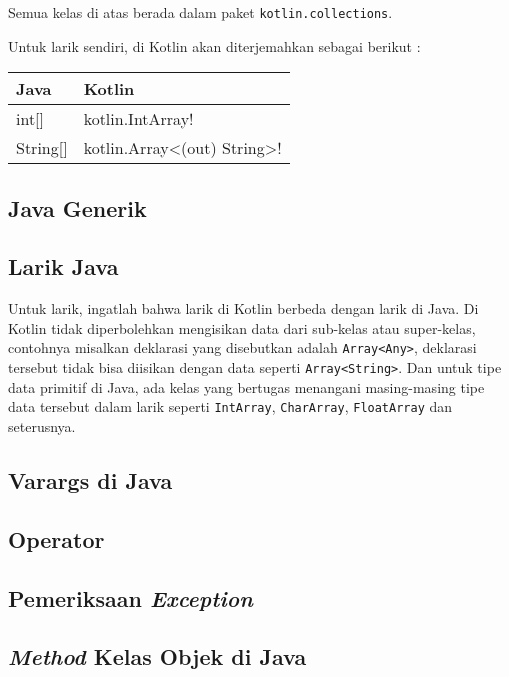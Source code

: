 Semua kelas di atas berada dalam paket \texttt{kotlin.collections}.

Untuk larik sendiri, di Kotlin akan diterjemahkan sebagai berikut :

\begin{center}
\begin{tabular}{|l|l|}
\hline
\textbf{Java} & \textbf{Kotlin} \\
\hline
int[] & kotlin.IntArray! \\
\hline
String[] & kotlin.Array<(out) String>! \\
\hline
\end{tabular}
\end{center}

\subsection{Java Generik}

\subsection{Larik Java}

Untuk larik, ingatlah bahwa larik di Kotlin berbeda dengan larik di Java. Di Kotlin tidak diperbolehkan mengisikan data dari sub-kelas atau super-kelas, contohnya misalkan deklarasi yang disebutkan adalah \texttt{Array<Any>}, deklarasi tersebut tidak bisa diisikan dengan data seperti \texttt{Array<String>}. Dan untuk tipe data primitif di Java, ada kelas yang bertugas menangani masing-masing tipe data tersebut dalam larik seperti \texttt{IntArray}, \texttt{CharArray}, \texttt{FloatArray} dan seterusnya.

\subsection{Varargs di Java}

\subsection{Operator}

\subsection{Pemeriksaan \textit{Exception}}

\subsection{\textit{Method} Kelas Objek di Java}

